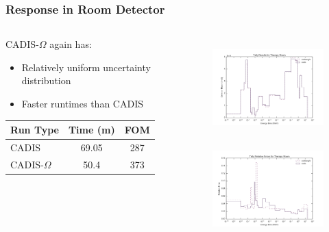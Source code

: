 \documentclass[xcolor=x11names,compress]{beamer}
\renewcommand{\(}{\begin{columns}}
\renewcommand{\)}{\end{columns}}
\newcommand{\<}[1]{\begin{column}{#1}}
\renewcommand{\>}{\end{column}}
\begin{document}
\begin{frame}[fragile]
  \frametitle{Response in Room Detector}
  
\begin{columns}
  \begin{column}{0.45\textwidth}
  CADIS-$\Omega$ again has:
  \begin{itemize}
    \item Relatively uniform uncertainty distribution
    \item Faster runtimes than CADIS
  \end{itemize}
  \vspace*{.5em}
  \begin{tabular}{|l|c c|}
  \hline
      Run Type & Time (m) & FOM \\  
      \hline
      CADIS  & 69.05  &  287 \\
      CADIS-$\Omega$ & 50.4 & 373 \\
      \hline
  \end{tabular}
  \end{column}
  \begin{column}{0.55\textwidth}
  	\begin{figure}
  	\begin{center}
  		\includegraphics[height=1.5in,clip]{../figs/room-both-tally.png}\\
  		\includegraphics[height=1.5in,clip]{../figs/room-both-re.png}
	\end{center}
  	\end{figure}
  \end{column}
\end{columns}
\end{frame}
\end{document}
